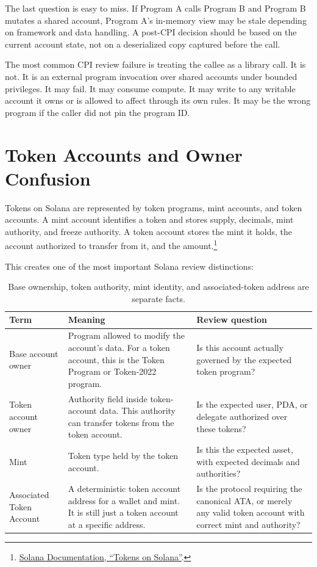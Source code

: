 The last question is easy to miss. If Program A calls Program B and Program B mutates a shared account, Program A's in-memory view may be stale depending on framework and data handling. A post-CPI decision should be based on the current account state, not on a deserialized copy captured before the call.

The most common CPI review failure is treating the callee as a library call. It is not. It is an external program invocation over shared accounts under bounded privileges. It may fail. It may consume compute. It may write to any writable account it owns or is allowed to affect through its own rules. It may be the wrong program if the caller did not pin the program ID.

\section{Token Accounts and Owner Confusion}

Tokens on Solana are represented by token programs, mint accounts, and token accounts. A mint account identifies a token and stores supply, decimals, mint authority, and freeze authority. A token account stores the mint it holds, the account authorized to transfer from it, and the amount.\footnote{\href{https://solana.com/docs/tokens}{Solana Documentation, ``Tokens on Solana''}.}

This creates one of the most important Solana review distinctions:

\begin{table}[htbp]
\centering
\small
\renewcommand{\arraystretch}{1.18}
\begin{tabularx}{\textwidth}{@{}>{\RaggedRight\arraybackslash}p{}>{\RaggedRight\arraybackslash}p{}X@{}}
\toprule
Term & Meaning & Review question \\
\midrule
Base account owner & Program allowed to modify the account's data. For a token account, this is the Token Program or Token-2022 program. & Is this account actually governed by the expected token program? \\
Token account owner & Authority field inside token-account data. This authority can transfer tokens from the token account. & Is the expected user, PDA, or delegate authorized over these tokens? \\
Mint & Token type held by the token account. & Is this the expected asset, with expected decimals and authorities? \\
Associated Token Account & A deterministic token account address for a wallet and mint. It is still just a token account at a specific address. & Is the protocol requiring the canonical ATA, or merely any valid token account with correct mint and authority? \\
\bottomrule
\end{tabularx}
\caption{Base ownership, token authority, mint identity, and associated-token address are separate facts.}
\end{table}

